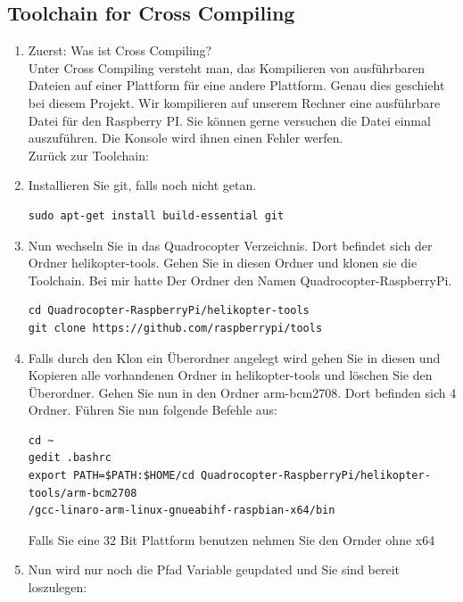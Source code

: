 \documentclass{article}
\begin{document}
\subsection{Toolchain for Cross Compiling}
\begin{enumerate}
\item[] Zuerst: Was ist Cross Compiling?\\
Unter Cross Compiling versteht man, das Kompilieren von ausführbaren Dateien auf einer Plattform für eine andere Plattform.
Genau dies geschieht bei diesem Projekt. Wir kompilieren auf unserem Rechner eine ausführbare Datei für den Raspberry PI. Sie können gerne versuchen die Datei einmal auszuführen. Die Konsole wird ihnen einen Fehler werfen.\\

Zurück zur Toolchain:\\

\item Installieren Sie git, falls noch nicht getan.
\begin{verbatim}
sudo apt-get install build-essential git
\end{verbatim}

\item Nun wechseln Sie in das Quadrocopter Verzeichnis. Dort befindet sich der Ordner helikopter-tools. Gehen Sie in diesen Ordner und klonen sie die Toolchain. Bei mir hatte Der Ordner den Namen Quadrocopter-RaspberryPi. 

\begin{verbatim}
cd Quadrocopter-RaspberryPi/helikopter-tools
git clone https://github.com/raspberrypi/tools
\end{verbatim}

\item Falls durch den Klon ein Überordner angelegt wird gehen Sie in diesen und Kopieren alle vorhandenen Ordner in helikopter-tools und löschen Sie den Überordner. Gehen Sie nun in den Ordner arm-bcm2708. Dort befinden sich 4 Ordner. Führen Sie nun folgende Befehle aus:\\

\begin{verbatim}
cd ~
gedit .bashrc
export PATH=$PATH:$HOME/cd Quadrocopter-RaspberryPi/helikopter-tools/arm-bcm2708
/gcc-linaro-arm-linux-gnueabihf-raspbian-x64/bin
\end{verbatim}
Falls Sie eine 32 Bit Plattform benutzen nehmen Sie den Ornder ohne x64\\

\item Nun wird nur noch die Pfad Variable geupdated und Sie sind bereit loszulegen:\\


\end{enumerate}
\end{document}
